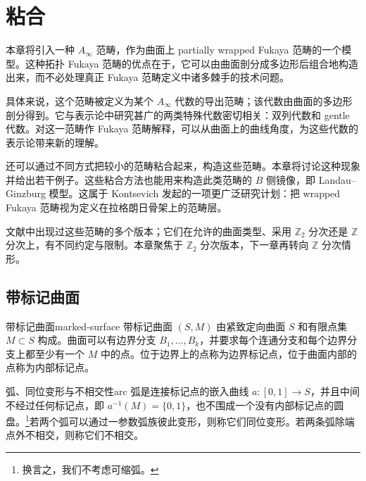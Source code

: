 \chapter{粘合}\label{ch:gluing}
本章将引入一种 $A_\infty$ 范畴，作为曲面上 partially wrapped Fukaya 范畴的一个模型。这种拓扑 Fukaya 范畴的优点在于，它可以由曲面剖分成多边形后组合地构造出来，而不必处理真正 Fukaya 范畴定义中诸多棘手的技术问题。

具体来说，这个范畴被定义为某个 $A_\infty$ 代数的导出范畴；该代数由曲面的多边形剖分得到。它与表示论中研究甚广的两类特殊代数密切相关：双列代数和 gentle 代数。对这一范畴作 Fukaya 范畴解释，可以从曲面上的曲线角度，为这些代数的表示论带来新的理解。

还可以通过不同方式把较小的范畴粘合起来，构造这些范畴。本章将讨论这种现象并给出若干例子。这些粘合方法也能用来构造此类范畴的 $B$ 侧镜像，即 Landau--Ginzburg 模型。这属于 Kontsevich 发起的一项更广泛研究计划：把 wrapped Fukaya 范畴视为定义在拉格朗日骨架上的范畴层。

文献中出现过这些范畴的多个版本；它们在允许的曲面类型、采用 $\mathbb Z_2$ 分次还是 $\mathbb Z$ 分次上，有不同约定与限制。本章聚焦于 $\mathbb Z_2$ 分次版本，下一章再转向 $\mathbb Z$ 分次情形。

\section{带标记曲面}\label{sec:marked-surfaces}
\begin{definition}{带标记曲面}{marked-surface}
带标记曲面 $(S,M)$ 由紧致定向曲面 $S$ 和有限点集 $M\subset S$ 构成。曲面可以有边界分支 $B_1,\ldots,B_k$，并要求每个连通分支和每个边界分支上都至少有一个 $M$ 中的点。位于边界上的点称为边界标记点，位于曲面内部的点称为内部标记点。
\end{definition}

\begin{definition}{弧、同位变形与不相交性}{arc}
弧是连接标记点的嵌入曲线 $a\colon[0,1]\to S$，并且中间不经过任何标记点，即 $a^{-1}(M)=\{0,1\}$，也不围成一个没有内部标记点的圆盘。\footnote{换言之，我们不考虑可缩弧。}若两个弧可以通过一参数弧族彼此变形，则称它们同位变形。若两条弧除端点外不相交，则称它们不相交。
\end{definition}

